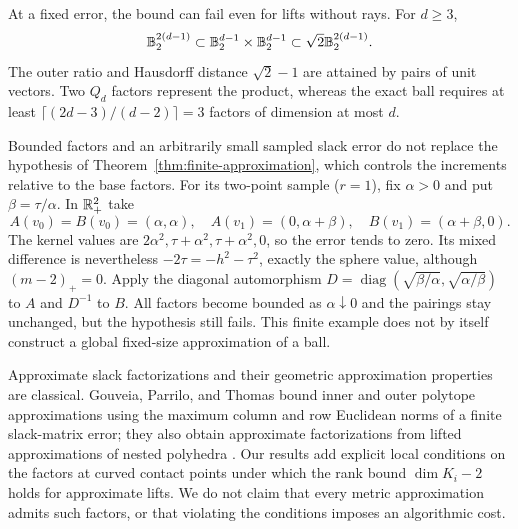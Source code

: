 At a fixed error, the bound can fail even for lifts without rays. For $d\geq3$,
\[
 \mathbb B_2^{2(d-1)}\subset
 \mathbb B_2^{d-1}\times\mathbb B_2^{d-1}
 \subset\sqrt2\mathbb B_2^{2(d-1)}.
\]
The outer ratio and Hausdorff distance $\sqrt2-1$ are attained by
pairs of unit vectors. Two $Q_d$ factors represent the product, whereas
the exact ball requires at least
$\lceil(2d-3)/(d-2)\rceil=3$ factors of dimension at most $d$.

Bounded factors and an arbitrarily small sampled slack error do not
replace the hypothesis of Theorem~\ref{thm:finite-approximation}, which
controls the increments relative to the base factors.
For its two-point sample ($r=1$), fix $\alpha>0$ and put
$\beta=\tau/\alpha$. In $\mathbb R_+^2$ take
\[
 A(v_0)=B(v_0)=(\alpha,\alpha),\quad
 A(v_1)=(0,\alpha+\beta),\quad B(v_1)=(\alpha+\beta,0).
\]
The kernel values are $2\alpha^2,\tau+\alpha^2,
\tau+\alpha^2,0$, so the error tends to zero. Its mixed difference
is nevertheless $-2\tau=-h^2-\tau^2$, exactly the sphere value,
although $(m-2)_+=0$. Apply the diagonal automorphism
$D=\operatorname{diag}(\sqrt{\beta/\alpha},\sqrt{\alpha/\beta})$
to $A$ and $D^{-1}$ to $B$. All factors become bounded as
$\alpha\downarrow0$ and the pairings stay unchanged, but the
hypothesis still fails. This finite example does not by
itself construct a global fixed-size approximation of a ball.

Approximate slack factorizations and their geometric approximation
properties are classical. Gouveia, Parrilo, and Thomas bound inner and
outer polytope approximations using the maximum column and row Euclidean
norms of a finite slack-matrix error; they also obtain approximate
factorizations from lifted approximations of nested polyhedra
\cite[Sections~2.7 and~4.2]{GPTApprox2015}. Our results add explicit
local conditions on the factors at curved contact points under which the
rank bound $\dim K_i-2$ holds for approximate lifts. We do not claim that
every metric approximation admits such factors, or that violating the
conditions imposes an algorithmic cost.
